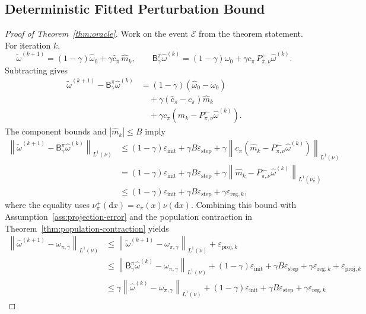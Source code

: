 \documentclass{article}
\newcommand{\mhat}{\widehat m}
\newcommand{\1}{\mathbf{1}}
\newcommand{\dd}{\mathrm{d}}
\newcommand{\nup}{\nu_\pi^+}
\newcommand{\cpi}{c_\pi}
\newcommand{\omegazero}{\omega_0}
\newcommand{\omegastar}{\omega_{\pi,\gamma}}
\newcommand{\omegahatzero}{\widehat{\omega}_0}
\newcommand{\Bpig}{\mathsf{B}_\gamma^\pi}
\newcommand{\Pback}{P_{\pi,\nu}^{\leftarrow}}
\newcommand{\Mpi}{\Pback}
\newcommand{\omegahat}{\widehat{\omega}}
\newcommand{\omegatilde}{\widetilde{\omega}}
\newcommand{\chat}{\widehat{c}_\pi}
\newcommand{\norm}[2][]{\left\lVert #2 \right\rVert_{#1}}
\newcommand{\LoneNu}[1]{\norm[L^1(\nu)]{#1}}
\newcommand{\LoneNuPlus}[1]{\norm[L^1(\nu_\pi^+)]{#1}}
\newcommand{\abs}[1]{\left\lvert #1 \right\rvert}
\theoremstyle{plain}
\theoremstyle{definition}
\theoremstyle{remark}
\begin{document}
\subsection{Deterministic Fitted Perturbation Bound}

\begin{proof}[Proof of Theorem~\ref{thm:oracle}]
Work on the event $\mathcal E$ from the theorem statement.
For iteration $k$,
\[
    \omegatilde^{(k+1)}
    =
    (1-\gamma)\omegahatzero+\gamma\chat\,\mhat_k,
    \qquad
    \Bpig\omegahat^{(k)}
    =
    (1-\gamma)\omegazero+\gamma\cpi\,\Mpi\omegahat^{(k)}.
\]
Subtracting gives
\[
\begin{aligned}
    \omegatilde^{(k+1)}-\Bpig\omegahat^{(k)}
    &=
    (1-\gamma)(\omegahatzero-\omegazero)\\
    &\quad+
    \gamma(\chat-\cpi)\mhat_k\\
    &\quad+
    \gamma\cpi(\mhat_k-\Mpi\omegahat^{(k)}).
\end{aligned}
\]
The component bounds and $\abs{\mhat_k}\le B$ imply
\[
\begin{aligned}
    \LoneNu{\omegatilde^{(k+1)}-\Bpig\omegahat^{(k)}}
    &\le
    (1-\gamma)\varepsilon_{\mathrm{init}}
    +\gamma B\varepsilon_{\mathrm{step}}
    +\gamma\LoneNu{\cpi(\mhat_k-\Mpi\omegahat^{(k)})}\\
    &=
    (1-\gamma)\varepsilon_{\mathrm{init}}
    +\gamma B\varepsilon_{\mathrm{step}}
    +\gamma\LoneNuPlus{\mhat_k-\Mpi\omegahat^{(k)}}\\
    &\le
    (1-\gamma)\varepsilon_{\mathrm{init}}
    +\gamma B\varepsilon_{\mathrm{step}}
    +\gamma\varepsilon_{\mathrm{reg},k},
\end{aligned}
\]
where the equality uses $\nup(\dd x)=\cpi(x)\nu(\dd x)$.
Combining this bound with Assumption~\ref{ass:projection-error} and the
population contraction in Theorem~\ref{thm:population-contraction} yields
\[
\begin{aligned}
    \LoneNu{\omegahat^{(k+1)}-\omegastar}
    &\le
    \LoneNu{\omegatilde^{(k+1)}-\omegastar}
    +\varepsilon_{\mathrm{proj},k}\\
    &\le
    \LoneNu{\Bpig\omegahat^{(k)}-\omegastar}
    +(1-\gamma)\varepsilon_{\mathrm{init}}
    +\gamma B\varepsilon_{\mathrm{step}}
    +\gamma\varepsilon_{\mathrm{reg},k}
    +\varepsilon_{\mathrm{proj},k}\\
    &\le
    \gamma\LoneNu{\omegahat^{(k)}-\omegastar}
    +(1-\gamma)\varepsilon_{\mathrm{init}}
    +\gamma B\varepsilon_{\mathrm{step}}
    +\gamma\varepsilon_{\mathrm{reg},k}

\end{aligned}\]
\end{proof}
\end{document}
